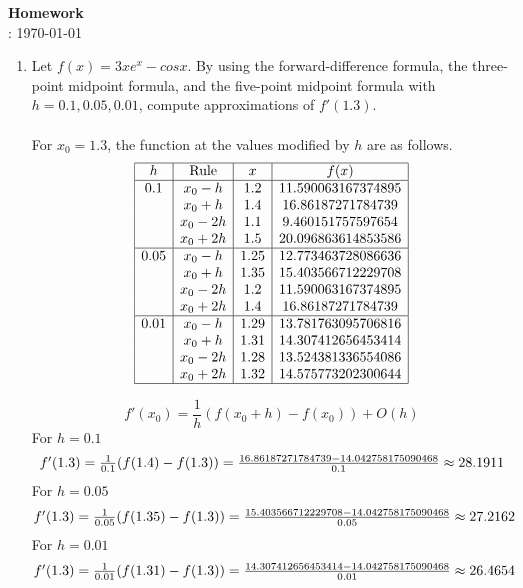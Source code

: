\documentclass[12pt]{article}
\title{}
\author{Josh Morales}
\date{\today}
\begin{document}
\pagestyle{fancy}
\begin{center}
\textbf{\Large Homework } \\
: \today
\end{center}
\begin{enumerate}[leftmargin=2em]
    \item
    Let $f (x) = 3xe^x - cos x$. By using the forward-difference formula, the three-point
midpoint formula, and the five-point midpoint formula with $h = 0.1, 0.05,
0.01$, compute approximations of $f'(1.3)$.\\
\\For $x_0=1.3$, the function at the values modified by $h$ are as follows.
\[
\begin{array}{|c|c|c|c|}
\hline
h & \text{Rule} & x & f(x) \\
\hline
0.1  & x_0 - h  & 1.2  & 11.590063167374895  \\
     & x_0 + h  & 1.4  & 16.86187271784739  \\
     & x_0 - 2h & 1.1  & 9.460151757597654   \\
     & x_0 + 2h & 1.5  & 20.096863614853586  \\
\hline
0.05 & x_0 - h  & 1.25 & 12.773463728086636  \\
     & x_0 + h  & 1.35 & 15.403566712229708  \\
     & x_0 - 2h & 1.2  & 11.590063167374895  \\
     & x_0 + 2h & 1.4  & 16.86187271784739  \\
\hline
0.01 & x_0 - h  & 1.29 & 13.781763095706816  \\
     & x_0 + h  & 1.31 & 14.307412656453414  \\
     & x_0 - 2h & 1.28 & 13.524381336554086  \\
     & x_0 + 2h & 1.32 & 14.575773202300644  \\
\hline
\end{array}
\]


\[
f'(x_0) = \frac{1}{h}(f(x_0+h)-f(x_0)) + O(h)
\]
For $h = 0.1$
\[
\hbox{$f'(1.3) = \frac{1}{0.1}(f(1.4)-f(1.3)) = \frac{16.86187271784739-14.042758175090468}{0.1} \approx 28.1911$}
\]
For $h = 0.05$
\[
\hbox{$f'(1.3) = \frac{1}{0.05}(f(1.35)-f(1.3)) = \frac{15.403566712229708-14.042758175090468}{0.05} \approx 27.2162$}
\]
For $h=0.01$
\[
\hbox{$f'(1.3) = \frac{1}{0.01}(f(1.31)-f(1.3)) = \frac{14.307412656453414-14.042758175090468}{0.01} \approx 26.4654$}
\]

\end{enumerate}
\end{document}
